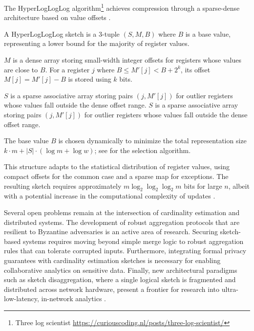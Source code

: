 The HyperLogLogLog algorithm\footnote{Three log scientist \url{https://curiouscoding.nl/posts/three-log-scientist/}} achieves compression through a sparse-dense architecture based on value offsets \cite{Karppa2022HyperLogLogLogCE}.

\begin{definition}
    A HyperLogLogLog sketch is a 3-tuple $(S, M, B)$ where $B$ is a base value, representing a lower bound for the majority of register values.

    $M$ is a dense array storing small-width integer offsets for registers whose values are close to $B$. For a register $j$ where $B \leq M'[j] < B + 2^k$, its offset $M[j] = M'[j] - B$ is stored using $k$ bits.

    $S$ is a sparse associative array storing pairs $(j, M'[j])$ for outlier registers whose values fall outside the dense offset range. $S$ is a sparse associative array storing pairs $(j, M'[j])$ for outlier registers whose values fall outside the dense offset range.

    The base value $B$ is chosen dynamically to minimize the total representation size $k \cdot m + |S| \cdot (\log m + \log w)$; see \cite{Karppa2022HyperLogLogLogCE} for the selection algorithm.
\end{definition}

This structure adapts to the statistical distribution of register values, using compact offsets for the common case and a sparse map for exceptions. The resulting sketch requires approximately $m \log_2\log_2\log_2 m$ bits for large $n$, albeit with a potential increase in the computational complexity of updates \cite{Karppa2022HyperLogLogLogCE}.

Several open problems remain at the intersection of cardinality estimation and distributed systems. The development of robust aggregation protocols that are resilient to Byzantine adversaries is an active area of research. Securing sketch-based systems requires moving beyond simple merge logic to robust aggregation rules that can tolerate corrupted inputs. Furthermore, integrating formal privacy guarantees with cardinality estimation sketches is necessary for enabling collaborative analytics on sensitive data. Finally, new architectural paradigms such as sketch disaggregation, where a single logical sketch is fragmented and distributed across network hardware, present a frontier for research into ultra-low-latency, in-network analytics \cite{Langlet2025SketchDA}.

